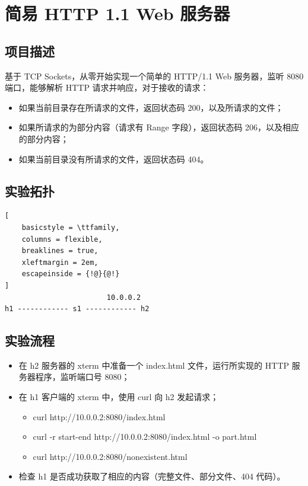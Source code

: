 \documentclass{article}
\begin{document}
\section{简易 HTTP 1.1 Web 服务器}
\subsection{项目描述}
基于 TCP Sockets，从零开始实现一个简单的 HTTP/1.1 Web 服务器，监听 8080 端口，能够解析 HTTP 请求并响应，对于接收的请求：

\begin{itemize}
    \item 如果当前目录存在所请求的文件，返回状态码 200，以及所请求的文件；
    \item 如果所请求的为部分内容（请求有 Range 字段），返回状态码 206，以及相应的部分内容；
    \item 如果当前目录没有所请求的文件，返回状态码 404。
\end{itemize}



\subsection{实验拓扑}
\begin{lstlisting}[
    basicstyle = \ttfamily,
    columns = flexible,
    breaklines = true,
    xleftmargin = 2em,
    escapeinside = {!@}{@!}
]
                        10.0.0.2
h1 ------------ s1 ------------ h2
\end{lstlisting}



\subsection{实验流程}
\begin{itemize}
    \item 在 h2 服务器的 xterm 中准备一个 index.html 文件，运行所实现的 HTTP 服务器程序，监听端口号 8080；
    \item 在 h1 客户端的 xterm 中，使用 curl 向 h2 发起请求；
    \begin{itemize}\tt
        \item curl http://10.0.0.2:8080/index.html
        \item curl -r start-end http://10.0.0.2:8080/index.html -o part.html
        \item curl http://10.0.0.2:8080/nonexistent.html
    \end{itemize}
    \item 检查 h1 是否成功获取了相应的内容（完整文件、部分文件、404 代码）。
\end{itemize}
\end{document}
